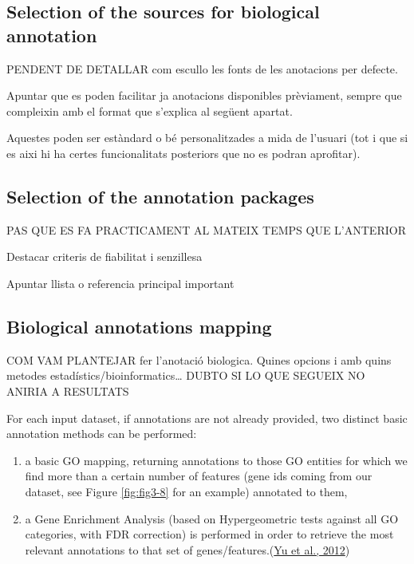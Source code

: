 \documentclass[a4paper, nobind]{templates/ociamthesis}
\begin{document}
\hypertarget{biosources}{%
\subsection{Selection of the sources for biological annotation}\label{biosources}}

PENDENT DE DETALLAR com escullo les fonts de les anotacions per defecte.

Apuntar que es poden facilitar ja anotacions disponibles prèviament, sempre que compleixin amb el format que s'explica al següent apartat.

Aquestes poden ser estàndard o bé personalitzades a mida de l'usuari (tot i que si es aixi hi ha certes funcionalitats posteriors que no es podran aprofitar).

\clearpage

\hypertarget{biopackages}{%
\subsection{Selection of the annotation packages}\label{biopackages}}

PAS QUE ES FA PRACTICAMENT AL MATEIX TEMPS QUE L'ANTERIOR

Destacar criteris de fiabilitat i senzillesa

Apuntar llista o referencia principal important

\hypertarget{bioannotation}{%
\subsection{Biological annotations mapping}\label{bioannotation}}

COM VAM PLANTEJAR fer l'anotació biologica. Quines opcions i amb quins metodes estadístics/bioinformatics\ldots{}
DUBTO SI LO QUE SEGUEIX NO ANIRIA A RESULTATS

For each input dataset, if annotations are not already provided, two distinct basic annotation methods can be performed:

\begin{enumerate}
\def\labelenumi{(\roman{enumi})}
\item
  a basic GO mapping, returning annotations to those GO entities for which we find more than a certain number of features (gene ids coming from our dataset, see Figure \ref{fig:fig3-8} for an example) annotated to them,
\item
  a Gene Enrichment Analysis (based on Hypergeometric tests against all GO categories, with FDR correction) is performed in order to retrieve the most relevant annotations to that set of genes/features.(\protect\hyperlink{ref-yu_clusterprofiler_2012}{Yu et al., 2012})
\end{enumerate}
\end{document}
